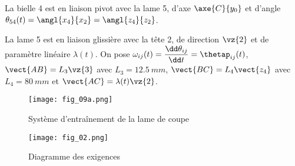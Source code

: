 La bielle 4 est en liaison pivot avec la lame 5, d’axe $\axe{C}{y_0}$ et d’angle $\theta_{54} (t)= \angl{x_4}{x_2} = \angl{z_4}{z_2} $.

La lame 5 est en liaison glissière avec la tête 2, de direction  $\vz{2}$ et de paramètre linéaire $\lambda(t)$.
On pose $\omega_{ij} (t)= \dfrac{\dd \theta_{ij}}{\dd t} = \thetap_{ij}(t)$, $\vect{AB}=L_3\vz{3}$ avec $L_3=\SI{12,5}{mm}$, $\vect{BC}=L_4 \vect{z_4}$  avec $L_4=\SI{80}{mm}$ et $\vect{AC}=\lambda(t)\vz{2}$.


\begin{figure}
\centering
\texttt{[image: fig\_09a.png]}
\caption{Système d’entraînement de la lame de coupe}
\end{figure}

\begin{figure}
\centering
\texttt{[image: fig\_02.png]}
\caption{Diagramme des exigences \label{fig_02}}
\end{figure}
